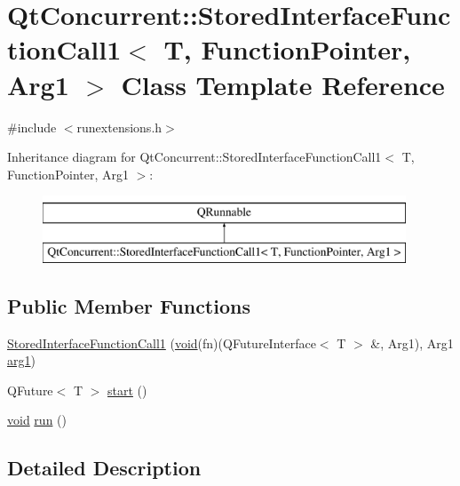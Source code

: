 \hypertarget{class_qt_concurrent_1_1_stored_interface_function_call1}{\section{Qt\-Concurrent\-:\-:Stored\-Interface\-Function\-Call1$<$ T, Function\-Pointer, Arg1 $>$ Class Template Reference}
\label{class_qt_concurrent_1_1_stored_interface_function_call1}
}


{\ttfamily \#include $<$runextensions.\-h$>$}

Inheritance diagram for Qt\-Concurrent\-:\-:Stored\-Interface\-Function\-Call1$<$ T, Function\-Pointer, Arg1 $>$\-:\begin{figure}[H]
\begin{center}
\leavevmode
\includegraphics[height=2.000000cm]{class_qt_concurrent_1_1_stored_interface_function_call1}
\end{center}
\end{figure}
\subsection*{Public Member Functions}
\begin{DoxyCompactItemize}
\item 
\hyperlink{class_qt_concurrent_1_1_stored_interface_function_call1_acaa73d2a27f5044aceec2671008363a0}{Stored\-Interface\-Function\-Call1} (\hyperlink{group___u_a_v_objects_plugin_ga444cf2ff3f0ecbe028adce838d373f5c}{void}(fn)(Q\-Future\-Interface$<$ T $>$ \&, Arg1), Arg1 \hyperlink{glext_8h_a4b247ab422408c1761a36f9034c2585b}{arg1})
\item 
Q\-Future$<$ T $>$ \hyperlink{class_qt_concurrent_1_1_stored_interface_function_call1_ae15bac1f0737c7355cbd5ea8eefe5739}{start} ()
\item 
\hyperlink{group___u_a_v_objects_plugin_ga444cf2ff3f0ecbe028adce838d373f5c}{void} \hyperlink{class_qt_concurrent_1_1_stored_interface_function_call1_ac5e1c5c825c5994aa855d11e48742056}{run} ()
\end{DoxyCompactItemize}


\subsection{Detailed Description}
